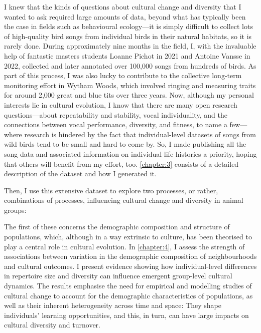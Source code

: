 I knew that the kinds of questions about cultural change and diversity that I wanted to ask required large amounts of data, beyond what has typically been the case in fields such as behavioural ecology---it is simply difficult to collect lots of high-quality bird songs from individual birds in their natural habitats, so it is rarely done. During approximately nine months in the field, I, with the invaluable help of fantastic masters students Loanne Pichot in 2021 and Antoine Vansse in 2022, collected and later annotated over 100,000 songs from hundreds of birds. As part of this process, I was also lucky to contribute to the collective long-term monitoring effort in Wytham Woods, which involved ringing and measuring traits for around 2,000 great and blue tits over three years. Now, although my personal interests lie in cultural evolution, I know that there are many open research questions---about repeatability and stability, vocal individuality, and the connections between vocal performance, diversity, and fitness, to name a few---where research is hindered by the fact that individual-level datasets of songs from wild birds tend to be small and hard to come by. So, I made publishing all the song data and associated information on individual life histories a priority, hoping that others will benefit from my effort, too. \autoref{chapter:3} consists of a detailed description of the dataset and how I generated it.

Then, I use this extensive dataset to explore two processes, or rather, combinations of processes, influencing cultural change and diversity in animal groups:

The first of these concerns the demographic composition and structure of populations, which, although in a way extrinsic to culture, has been theorised to play a central role in cultural evolution. In \autoref{chapter:4}, I assess the strength of associations between variation in the demographic composition of neighbourhoods and cultural outcomes. I present evidence showing how individual-level differences in repertoire size and diversity can influence emergent group-level cultural dynamics. The results emphasise the need for empirical and modelling studies of cultural change to account for the demographic characteristics of populations, as well as their inherent heterogeneity across time and space: They shape individuals' learning opportunities, and this, in turn, can have large impacts on cultural diversity and turnover.

